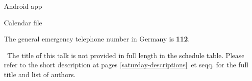 \enlargethispage{1\baselineskip}
\vfill
\begin{minipage}[t]{0.47\linewidth}
  \begin{center}
    Android app

  \end{center}
\end{minipage}
\hfill
\begin{minipage}[t]{0.47\linewidth}
  \begin{center}
    Calendar file

  \end{center}
\end{minipage}

\noindent
The general emergency telephone number in Germany is \textbf{112}.

\small{
\noindent
  \diamondSymbol\ The title of this talk is not provided in full length in the schedule table. Please refer to the short description at pages \ref{saturday-descriptions}~et seqq. for the full title and list of authors.
}\normalsize


\newpage
